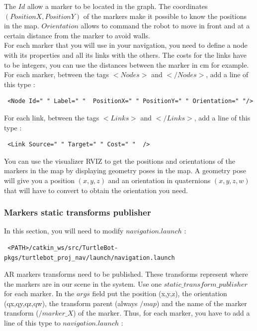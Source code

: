 \documentclass[10pt,a4paper]{article}
\begin{document}
The $Id$ allow a marker to be located in the graph. The coordinates $(PositionX,PositionY)$ of the markers make it possible to know the positions in the map. $Orientation$ allows to command the robot to move in front and at a certain distance from the marker to avoid walls.\\

For each marker that you will use in your navigation, you need to define a node with its properties and all its links with the others. The costs for the links have to be integers, you can use the distances between the marker in cm for example. \\

For each marker, between the tags $<Nodes>$ and $</Nodes>$, add a line of this type : 

\begin{verbatim} <Node Id=" " Label=" "  PositionX=" " PositionY=" " Orientation=" "/> \end{verbatim}

\newpage

For each link, between the tags $<Links>$ and $</Links>$, add a line of this type : 

\begin{verbatim} <Link Source=" " Target=" " Cost=" "  /> \end{verbatim}

You can use the visualizer RVIZ to get the positions and orientations of the markers in the map by displaying geometry poses in the map. A geometry pose will give you a position $(x,y,z)$ and an orientation in quaternions $(x,y,z,w)$ that will have to convert to obtain the orientation you need.

\subsubsection{Markers static transforms publisher}
\label{sec:markersStaticTransformsPublisher}

In this section, you will need to modify $navigation.launch$ :

\begin{verbatim} <PATH>/catkin_ws/src/TurtleBot-pkgs/turtlebot_proj_nav/launch/navigation.launch\end{verbatim}

AR markers transforms need to be published. These transforms represent where the markers are in our scene in the system. Use one $static\_transform\_publisher$ for each marker. In the $args$ field put the position (x,y,z), the orientation (qx,qy,qz,qw), the transform parent (always $/map$) and the name of the marker transform ($/marker\_X$) of the marker. Thus, for each marker, you have to add a line of this type to $navigation.launch$ :
\end{document}
